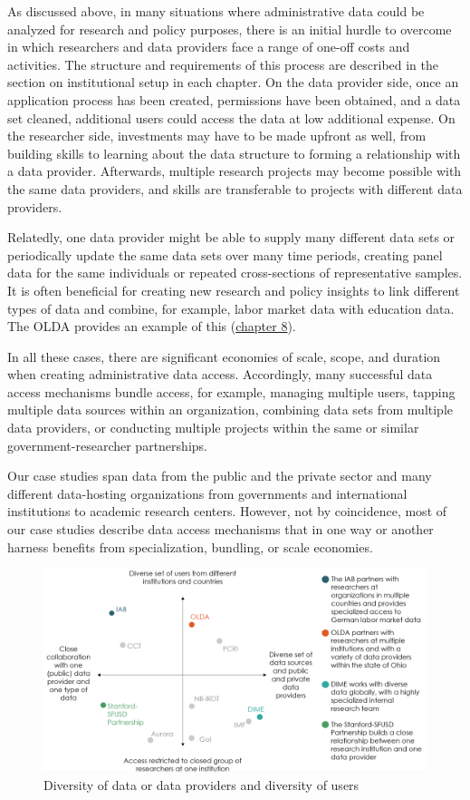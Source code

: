 As discussed above, in many situations where administrative data could be analyzed for research and policy purposes, there is an initial hurdle to overcome in which researchers and data providers face a range of one-off costs and activities. The structure and requirements of this process are described in the section on institutional setup in each chapter. On the data provider side, once an application process has been created, permissions have been obtained, and a data set cleaned, additional users could access the data at low additional expense. On the researcher side, investments may have to be made upfront as well, from building skills to learning about the data structure to forming a relationship with a data provider. Afterwards, multiple research projects may become possible with the same data providers, and skills are transferable to projects with different data providers.

Relatedly, one data provider might be able to supply many different data sets or periodically update the same data sets over many time periods, creating panel data for the same individuals or repeated cross-sections of representative samples. It is often beneficial for creating new research and policy insights to link different types of data and combine, for example, labor market data with education data. The OLDA provides an example of this (\protect\hyperlink{olda}{chapter 8}).

In all these cases, there are significant economies of scale, scope, and duration when creating administrative data access. Accordingly, many successful data access mechanisms bundle access, for example, managing multiple users, tapping multiple data sources within an organization, combining data sets from multiple data providers, or conducting multiple projects within the same or similar government-researcher partnerships.

Our case studies span data from the public and the private sector and many different data-hosting organizations from governments and international institutions to academic research centers. However, not by coincidence, most of our case studies describe data access mechanisms that in one way or another harness benefits from specialization, bundling, or scale economies.

\begin{figure}
\centering
\includegraphics{./figures/introfigure1.png}
\caption{\label{fig:introfig1}Diversity of data or data providers and diversity of users}
\end{figure}

